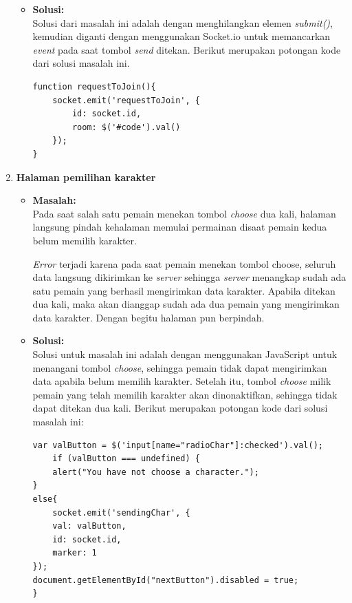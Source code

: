 \begin{enumerate}
\begin{itemize}
		\item \textbf{Solusi:} \\
		Solusi dari masalah ini adalah dengan menghilangkan elemen \textit{submit()}, kemudian diganti dengan menggunakan Socket.io untuk memancarkan \textit{event} pada saat tombol \textit{send} ditekan. Berikut merupakan potongan kode dari solusi masalah ini.
		
\begin{lstlisting}[caption={Proses memancarkan \textit{event}}, label={lst:emitEvent}, captionpos=b, frame=single]
function requestToJoin(){
	socket.emit('requestToJoin', {
		id: socket.id,
		room: $('#code').val()
	});
}
\end{lstlisting}	
	\end{itemize}
	
	\item \textbf{Halaman pemilihan karakter}
	\begin{itemize}
		\item \textbf{Masalah:} \\
		Pada saat salah satu pemain menekan tombol \textit{choose} dua kali, halaman langsung pindah kehalaman memulai permainan disaat pemain kedua belum memilih karakter.
		
		\textit{Error} terjadi karena pada saat pemain menekan tombol choose, seluruh data langsung dikirimkan ke \textit{server} sehingga \textit{server} menangkap sudah ada satu pemain yang berhasil mengirimkan data karakter. Apabila ditekan dua kali, maka akan dianggap sudah ada dua pemain yang mengirimkan data karakter. Dengan begitu halaman pun berpindah.
		
		\item \textbf{Solusi:} \\
		Solusi untuk masalah ini adalah dengan menggunakan JavaScript untuk menangani tombol \textit{choose}, sehingga pemain tidak dapat mengirimkan data apabila belum memilih karakter. Setelah itu, tombol \textit{choose}  milik pemain yang telah memilih karakter akan dinonaktifkan, sehingga tidak dapat ditekan dua kali. Berikut merupakan potongan kode dari solusi masalah ini:
		
\begin{lstlisting}[caption={Proses menangani tombol \textit{choose}}, label={lst:tombolChoose},captionpos=b, frame=single]
var valButton = $('input[name="radioChar"]:checked').val();
	if (valButton === undefined) {
	alert("You have not choose a character.");
}
else{
	socket.emit('sendingChar', {
	val: valButton,
	id: socket.id,
	marker: 1
});
document.getElementById("nextButton").disabled = true;
}
\end{lstlisting}
	\end{itemize}


\end{enumerate}
